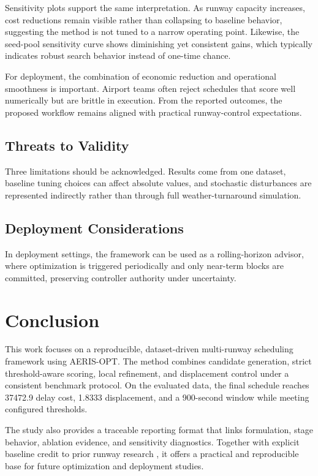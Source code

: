 \documentclass[conference]{IEEEtran}
\begin{document}
Sensitivity plots support the same interpretation. As runway capacity increases, cost reductions remain visible rather than collapsing to baseline behavior, suggesting the method is not tuned to a narrow operating point. Likewise, the seed-pool sensitivity curve shows diminishing yet consistent gains, which typically indicates robust search behavior instead of one-time chance.

For deployment, the combination of economic reduction and operational smoothness is important. Airport teams often reject schedules that score well numerically but are brittle in execution. From the reported outcomes, the proposed workflow remains aligned with practical runway-control expectations.

\subsection{Threats to Validity}
Three limitations should be acknowledged. Results come from one dataset, baseline tuning choices can affect absolute values, and stochastic disturbances are represented indirectly rather than through full weather-turnaround simulation.

\subsection{Deployment Considerations}
In deployment settings, the framework can be used as a rolling-horizon advisor, where optimization is triggered periodically and only near-term blocks are committed, preserving controller authority under uncertainty.

\section{Conclusion}
This work focuses on a reproducible, dataset-driven multi-runway scheduling framework using AERIS-OPT. The method combines candidate generation, strict threshold-aware scoring, local refinement, and displacement control under a consistent benchmark protocol. On the evaluated data, the final schedule reaches 37472.9 delay cost, 1.8333 displacement, and a 900-second window while meeting configured thresholds.

The study also provides a traceable reporting format that links formulation, stage behavior, ablation evidence, and sensitivity diagnostics. Together with explicit baseline credit to prior runway research \cite{ref19}, it offers a practical and reproducible base for future optimization and deployment studies.
\end{document}
